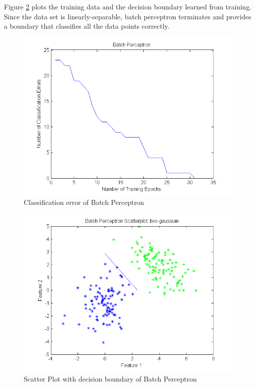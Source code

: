 \documentclass[12pt]{article}
\begin{document}
Figure \ref{fig:batchperceptscatter} plots the training data and the decision boundary learned from training. Since the data set is linearly-separable, batch perceptron terminates and provides a boundary that classifies all the data points correctly.

\begin{figure}[!t]
  \centering
  \includegraphics[scale=.70]{img/batch_errors.png}
  \caption{Classification error of Batch Perceptron}
  \label{fig:batchpercepterror}
\end{figure}

\begin{figure}[!t]
  \centering
  \includegraphics[scale=.70]{img/batch_scatterplot.png}
  \caption{Scatter Plot with decision boundary of Batch Perceptron}
  \label{fig:batchperceptscatter}
\end{figure}
\end{document}
